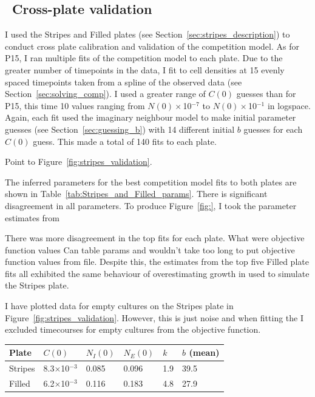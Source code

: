 \begin{multicols}{2}

\subsection{\thesubsection~Cross-plate validation}

I used the Stripes and Filled plates (see
Section~\ref{sec:stripes_description}) to conduct cross plate
calibration and validation of the competition model. As for P15, I ran
multiple fits of the competition model to each plate. Due to the
greater number of timepoints in the data, I fit to cell densities at
15 evenly spaced timepoints taken from a spline of the observed data
(see Section~\ref{sec:solving_comp}). I used a greater range of
\(C(0)\) guesses than for P15, this time 10 values ranging from
\(N(0)\times\)10\(^{-7}\) to \(N(0)\times\)10\(^{-1}\) in
logspace. Again, each fit used the imaginary neighbour model to make
initial parameter guesses (see Section~\ref{sec:guessing_b}) with 14
different initial \(b\) guesses for each \(C(0)\) guess. This made a
total of 140 fits to each plate.



Point to Figure~\ref{fig:stripes_validation}.


The inferred parameters for the best competition model fits to both
plates are shown in Table~\ref{tab:Stripes_and_Filled_params}. There
is significant disagreement in all parameters. To produce Figure~\ref{fig:}, I took the parameter estimates from


There was more disagreement in the top fits for each plate. What were
objective function values Can table params and wouldn't take too long
to put objective function values from file. Despite this, the
estimates from the top five Filled plate fits all exhibited the same
behaviour of overestimating growth in used to simulate the Stripes
plate.



I have plotted data for empty cultures on the Stripes plate in
Figure~\ref{fig:stripes_validation}. However, this is just noise and
when fitting the I excluded timecourses for empty cultures from the
objective function.


\begin{center}
  \begin{tabular}{l l l l l l}
    \hline
    Plate     & \(C(0)\)                   & \(N_{I}(0)\) & \(N_{E}(0)\) & \(k\) & \(b\) (mean)\\
    \hline
    Stripes   & 8.3\(\times\)10\(^{-3}\)   & 0.085      & 0.096       & 1.9  & 39.5\\
    Filled    & 6.2\(\times\)10\(^{-3}\)   & 0.116      & 0.183       & 4.8  & 27.9\\
    \hline
  \end{tabular}
  \label{tab:Stripes_and_Filled_params}
\end{center}



\end{multicols}
